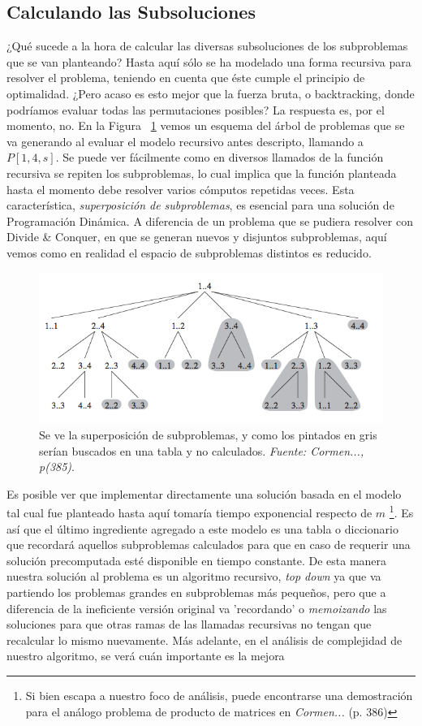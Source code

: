 \subsection{Calculando las Subsoluciones}

¿Qué sucede a la hora de calcular las diversas subsoluciones de los subproblemas que se van planteando? Hasta aquí sólo se ha modelado una forma recursiva para resolver el problema, teniendo en cuenta que éste cumple el principio de optimalidad. ¿Pero acaso es esto mejor que la fuerza bruta, o backtracking, donde podríamos evaluar todas las permutaciones posibles? La respuesta es, por el momento, no. En la Figura ~\ref{fig:overl} vemos un esquema del árbol de problemas que se va generando al evaluar el modelo recursivo antes descripto, llamando a $P[1,4,s]$. Se puede ver fácilmente como en diversos llamados de la función recursiva se repiten los subproblemas, lo cual implica que la función planteada hasta el momento debe resolver varios cómputos repetidas veces. Esta característica, \textsl{superposición de subproblemas}, es esencial para una solución de Programación Dinámica. A diferencia de un problema que se pudiera resolver con Divide \& Conquer, en que se generan nuevos y disjuntos subproblemas, aquí 
vemos como en realidad el espacio de subproblemas distintos es reducido.\\
\begin{figure}[h]
\centering                                                       
        \includegraphics[width=320pt]{./figs/p3overlapping.png}
	\caption{Se ve la superposición de subproblemas, y como los pintados en gris serían buscados en una tabla y no calculados. \textsl{Fuente: Cormen..., p(385)}. }
	\label{fig:overl}
\end{figure}
\indent Es posible ver que implementar directamente una solución basada en el modelo tal cual fue planteado hasta aquí tomaría tiempo exponencial respecto de $m$ \footnote{Si bien escapa a nuestro foco de análisis, puede encontrarse una demostración para el análogo problema de producto de matrices en \textit{Cormen...} (p. 386)}. Es así que el último ingrediente agregado a este modelo es una tabla o diccionario que recordará aquellos subproblemas calculados para que en caso de requerir una solución precomputada esté disponible en tiempo constante. De esta manera nuestra solución al problema es un algoritmo recursivo, \textsl{top down} ya que va partiendo los problemas grandes en subproblemas más pequeños, pero que a diferencia de la ineficiente versión original va 'recordando' o \textsl{memoizando} las soluciones para que otras ramas de las llamadas recursivas no tengan que recalcular lo mismo nuevamente. Más adelante, en el análisis de complejidad de nuestro algoritmo, se verá cuán importante es la mejora 
